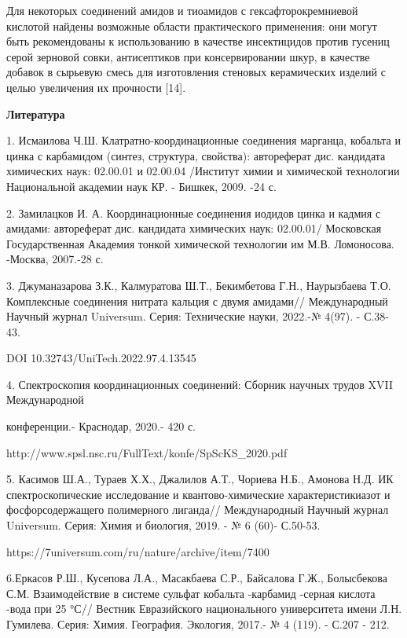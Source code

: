 \begin{multicols}{2}
Для некоторых соединений амидов и тиоамидов с гексафторокремниевой
кислотой найдены возможные области практического применения: они могут
быть рекомендованы к использованию в качестве инсектицидов против
гусениц серой зерновой совки, антисептиков при консервировании шкур, в
качестве добавок в сырьевую смесь для изготовления стеновых керамических
изделий с целью увеличения их прочности {[}14{]}.
\end{multicols}

\begin{center}
{\bfseries Литература}
\end{center}

\begin{noparindent}
1. Исмаилова Ч.Ш. Клатратно-координационные соединения марганца,
кобальта и цинка с карбамидом (синтез, структура, свойства): автореферат
дис. кандидата химических наук: 02.00.01 и 02.00.04 /Институт химии и
химической технологии Национальной академии наук КР. - Бишкек, 2009. -24
с.

2. Замилацков И. А. Координационные соединения иодидов цинка и кадмия с
амидами: автореферат дис. кандидата химических наук: 02.00.01/
Московская Государственная Академия тонкой химической технологии им М.В.
Ломоносова. -Москва, 2007.-28 с.

3. Джуманазарова З.К., Калмуратова Ш.Т., Бекимбетова Г.Н., Наурызбаева
Т.О. Комплексные соединения нитрата кальция с двумя амидами//
Международный Научный журнал Universum. Серия: Технические науки,
2022.-№ 4(97). - С.38-43.

DOI 10.32743/UniTech.2022.97.4.13545

4. Спектроскопия координационных соединений: Сборник научных трудов XVII
Международной

конференции.- Краснодар, 2020.- 420 с.

http://www.spsl.nsc.ru/FullText/konfe/SpScKS\_2020.pdf

5. Касимов Ш.А., Тураев Х.Х., Джалилов А.Т., Чориева Н.Б., Амонова Н.Д.
ИК спектроскопические исследование и квантово-химические
характеристикиазот и фосфорсодержащего полимерного лиганда//
Международный Научный журнал Universum. Серия: Химия и биология, 2019. -
№ 6 (60)- С.50-53.

https://7universum.com/ru/nature/archive/item/7400

6.Еркасов Р.Ш., Кусепова Л.А., Масакбаева С.Р., Байсалова Г.Ж.,
Болысбекова С.М. Взаимодействие в системе сульфат кобальта -карбамид
-серная кислота -вода при 25 °С// Вестник Евразийского национального
университета имени Л.Н. Гумилева. Серия: Химия. География. Экология,
2017.- № 4 (119). - С.207 - 212.


\end{noparindent}
